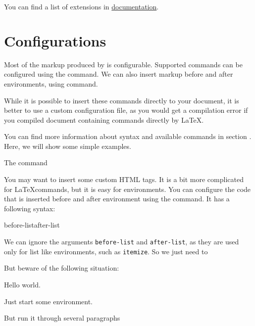 You can find a list of extensions in \href{https://www.kodymirus.cz/make4ht/make4ht-doc.html#extensions}{\makefourht{} documentation}.

\section{Configurations}
\label{sec:tutorial-configurations}

Most of the markup produced by \texfourht{} is configurable. Supported commands 
can be configured using the \texcommand{\Configure} command. We can also insert 
markup before and after environments, using \texcommand{\ConfigureEnv} command.

While it is possible to insert these commands directly to your document, it is better
to use a custom configuration file, as you would get a compilation error if you compiled 
document containing \texfourht{} commands directly by \LaTeX.

You can find more information about syntax and available commands in section .
Here, we will show some simple examples.

The  command



You may want to insert some custom HTML tags. It is a bit more complicated for
\LaTeX commands, but it is easy for environments. You can configure the code that is 
inserted before and after environment using the \texcommand{\ConfigureEnv} command.
It has a following syntax:

\begin{texsource}
{before-list}{after-list}
\end{texsource}

We can ignore the arguments \texttt{before-list} and \texttt{after-list}, as they
are used only for list like environments, such as \texttt{itemize}. So we just need to






But beware of the following situation:

\begin{texsource}
Hello world.
\begin{someenv}
Just start some environment.

But run it through several paragraphs
\end{someenv}
\end{texsource}

